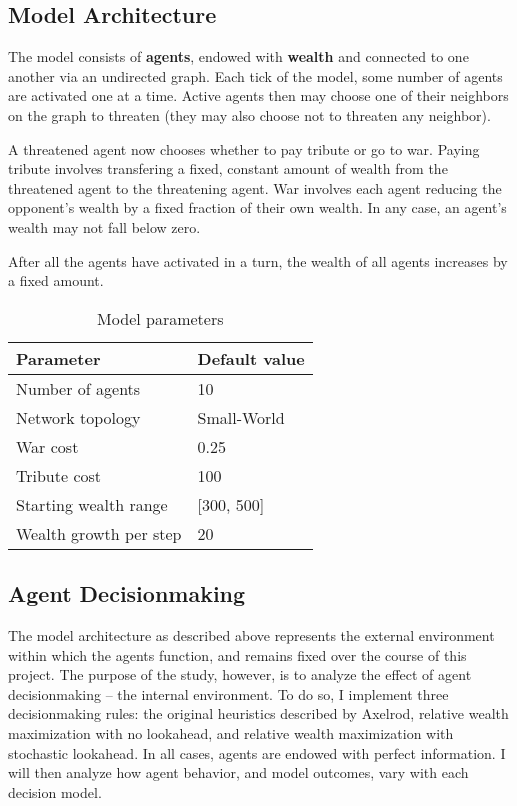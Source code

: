 \documentclass{article}
\begin{document}
\subsection{Model Architecture}

The model consists of \textbf{agents}, endowed with \textbf{wealth} and connected to one another via an undirected graph. Each tick of the model, some number of agents are activated one at a time. Active agents then may choose one of their neighbors on the graph to threaten (they may also choose not to threaten any neighbor). 

A threatened agent now chooses whether to pay tribute or go to war. Paying tribute involves transfering a fixed, constant amount of wealth from the threatened agent to the threatening agent. War involves each agent reducing the opponent's wealth by a fixed fraction of their own wealth. In any case, an agent's wealth may not fall below zero.

After all the agents have activated in a turn, the wealth of all agents increases by a fixed amount.

\begin{table}[h]
\begin{tabular}{@{}ll@{}}
\toprule
\textbf{Parameter}               & \textbf{Default value}                            \\ \midrule
Number of agents       & 10                                       \\
Network topology       & Small-World                              \\
War cost               & 0.25                                     \\
Tribute cost           & 100                                      \\
Starting wealth range        &  {[}300, 500{]} \\
Wealth growth per step & 20                                      \\ \bottomrule
\end{tabular}
\caption{Model parameters}
\end{table}

\subsection{Agent Decisionmaking}
The model architecture as described above represents the external environment within which the agents function, and remains fixed over the course of this project. The purpose of the study, however, is to analyze the effect of agent decisionmaking -- the internal environment. To do so, I implement three decisionmaking rules: the original heuristics described by Axelrod, relative wealth maximization with no lookahead, and relative wealth maximization with stochastic lookahead. In all cases, agents are endowed with perfect information.  I will then analyze how agent behavior, and model outcomes, vary with each decision model.
\end{document}
